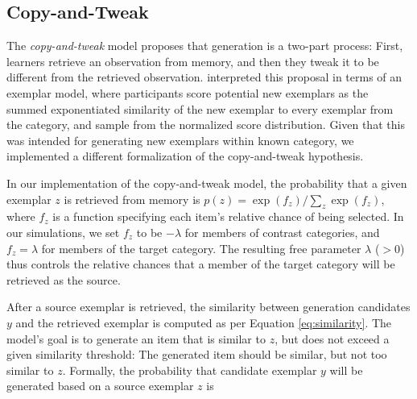 \documentclass[10pt,letterpaper]{article}
\begin{document}
\subsection{Copy-and-Tweak}
The \textit{copy-and-tweak} model proposes that generation is a two-part process: First, learners retrieve an observation from memory, and then they tweak it to be different from the retrieved observation. \citet{jern2013probabilistic} interpreted this proposal in terms of an exemplar model, where participants score potential new exemplars as the summed exponentiated similarity of the new exemplar to every exemplar from the category, and sample from the normalized score distribution. Given that this was intended for generating new exemplars within known category, we implemented a different formalization of the copy-and-tweak hypothesis.

In our implementation of the copy-and-tweak model, the probability that a given exemplar $z$ is retrieved from memory is $p(z) = \exp(f_z) / \sum_z{ \exp(f_z) }$, where $f_z$ is a function specifying each item's relative chance of being selected. In our simulations, we set $f_z$ to be $-\lambda$ for members of contrast categories, and $f_z = \lambda$ for members of the target category. The resulting free parameter $\lambda$ ($>0$) thus controls the relative chances that a member of the target category will be retrieved as the source. 

After a source exemplar is retrieved, the similarity between generation candidates $y$ and the retrieved exemplar is computed as per Equation \ref{eq:similarity}. The model's goal is to generate an item that is similar to $z$, but does not exceed a given similarity threshold: The generated item should be similar, but not too similar to $z$. Formally, the probability that candidate exemplar $y$ will be generated based on a source exemplar $z$ is 
\end{document}
